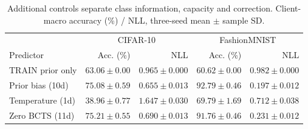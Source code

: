 \begin{table}[!htb]\centering\small
\caption{Additional controls separate class information, capacity and correction. Client-macro accuracy (\%) / NLL, three-seed mean $\pm$ sample SD.}\label{tab:full}
\begin{tabular}{lrrrr}\toprule
& \multicolumn{2}{c}{CIFAR-10} & \multicolumn{2}{c}{FashionMNIST}\\
Predictor & Acc. (\%) & NLL & Acc. (\%) & NLL\\\midrule
TRAIN prior only & $63.06\pm0.00$ & $0.965\pm0.000$ & $60.62\pm0.00$ & $0.982\pm0.000$\\
Prior bias (10d) & $75.08\pm0.59$ & $0.655\pm0.013$ & $92.79\pm0.46$ & $0.197\pm0.012$\\
Temperature (1d) & $38.96\pm0.77$ & $1.647\pm0.030$ & $69.79\pm1.69$ & $0.712\pm0.038$\\
Zero BCTS (11d) & $75.21\pm0.55$ & $0.690\pm0.013$ & $91.76\pm0.46$ & $0.231\pm0.012$\\
\bottomrule
\end{tabular}
\end{table}
